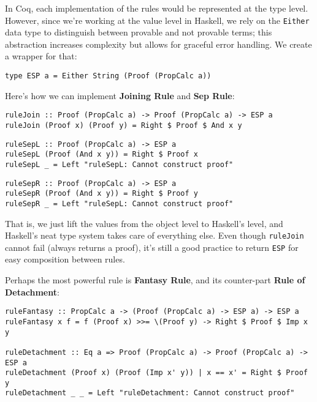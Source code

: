 \documentclass{article}
\begin{document}
In Coq, each implementation of the rules would be represented at the type level. However, since we're working at the value level in Haskell, we rely on the \texttt{Either} data type to distinguish between provable and not provable terms; this abstraction increases complexity but allows for graceful error handling. We create a wrapper for that:

\begin{lstlisting}
type ESP a = Either String (Proof (PropCalc a))
\end{lstlisting}

Here's how we can implement \textbf{Joining Rule} and \textbf{Sep Rule}:

\begin{lstlisting}
ruleJoin :: Proof (PropCalc a) -> Proof (PropCalc a) -> ESP a
ruleJoin (Proof x) (Proof y) = Right $ Proof $ And x y
\end{lstlisting}

\begin{minipage}[t]{0.51\textwidth}
\begin{lstlisting}
ruleSepL :: Proof (PropCalc a) -> ESP a
ruleSepL (Proof (And x y)) = Right $ Proof x
ruleSepL _ = Left "ruleSepL: Cannot construct proof"
\end{lstlisting}
\end{minipage}
\begin{minipage}[t]{0.49\textwidth}
\begin{lstlisting}
ruleSepR :: Proof (PropCalc a) -> ESP a
ruleSepR (Proof (And x y)) = Right $ Proof y
ruleSepR _ = Left "ruleSepL: Cannot construct proof"
\end{lstlisting}
\end{minipage}

That is, we just lift the values from the object level to Haskell's level, and Haskell's neat type system takes care of everything else. Even though \texttt{ruleJoin} cannot fail (always returns a proof), it's still a good practice to return \texttt{ESP} for easy composition between rules.

Perhaps the most powerful rule is \textbf{Fantasy Rule}, and its counter-part \textbf{Rule of Detachment}:

\begin{lstlisting}
ruleFantasy :: PropCalc a -> (Proof (PropCalc a) -> ESP a) -> ESP a
ruleFantasy x f = f (Proof x) >>= \(Proof y) -> Right $ Proof $ Imp x y

ruleDetachment :: Eq a => Proof (PropCalc a) -> Proof (PropCalc a) -> ESP a
ruleDetachment (Proof x) (Proof (Imp x' y)) | x == x' = Right $ Proof y
ruleDetachment _ _ = Left "ruleDetachment: Cannot construct proof"
\end{lstlisting}
\end{document}
